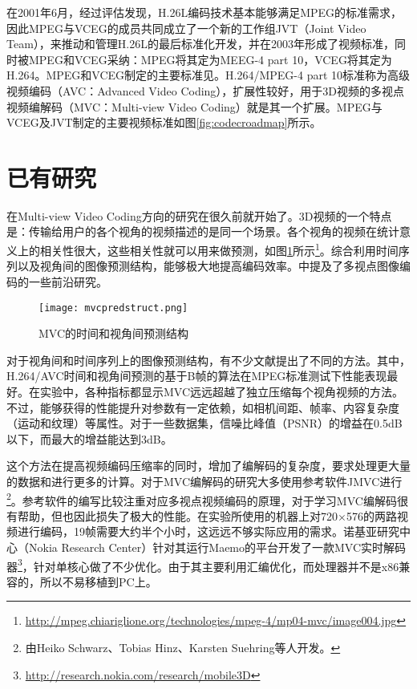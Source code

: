 在2001年6月，经过评估发现，H.26L编码技术基本能够满足MPEG的标准需求，因此MPEG与VCEG的成员共同成立了一个新的工作组JVT（Joint Video Team），来推动和管理H.26L的最后标准化开发，并在2003年形成了视频标准，同时被MPEG和VCEG采纳：MPEG将其定为MEEG-4 part 10，VCEG将其定为H.264。MPEG和VCEG制定的主要标准见。H.264/MPEG-4 part 10标准称为高级视频编码（AVC：Advanced Video Coding），扩展性较好，用于3D视频的多视点视频编解码（MVC：Multi-view Video Coding）就是其一个扩展。MPEG与VCEG及JVT制定的主要视频标准如图\ref{fig:codecroadmap}所示。

\section{已有研究}
\label{sec:previouswork}


在Multi-view Video Coding方向的研究在很久前就开始了。3D视频的一个特点是：传输给用户的各个视角的视频描述的是同一个场景。各个视角的视频在统计意义上的相关性很大，这些相关性就可以用来做预测，如图\ref{fig:mvcpredstruct}所示\footnote{\href{http://mpeg.chiariglione.org/technologies/mpeg-4/mp04-mvc/image004.jpg}{http://mpeg.chiariglione.org/technologies/mpeg-4/mp04-mvc/image004.jpg}}。综合利用时间序列以及视角间的图像预测结构，能够极大地提高编码效率\cite{merkle2005statistical,kaup2006analysis}。中提及了多视点图像编码的一些前沿研究。
\begin{figure}[htbp]
\begin{center}
\texttt{[image: mvcpredstruct.png]}
\caption{MVC的时间和视角间预测结构}
\label{fig:mvcpredstruct}
\end{center}
\end{figure}

对于视角间和时间序列上的图像预测结构，有不少文献提出了不同的方法。其中，H.264/AVC时间和视角间预测的基于B帧的算法\cite{kaup2006analysis}在MPEG标准测试下性能表现最好\cite{flierl2007motion,merkle2006efficient,mueller2006multi,merkle2007efficient}。在实验中，各种指标都显示MVC远远超越了独立压缩每个视角视频的方法。不过，能够获得的性能提升对参数有一定依赖，如相机间距、帧率、内容复杂度（运动和纹理）等属性。对于一些数据集，信噪比峰值（PSNR）的增益在0.5dB以下，而最大的增益能达到3dB。

这个方法在提高视频编码压缩率的同时，增加了编解码的复杂度，要求处理更大量的数据和进行更多的计算。对于MVC编解码的研究大多使用参考软件JMVC进行\footnote{由Heiko Schwarz、Tobias Hinz、Karsten Suehring等人开发。}。参考软件的编写比较注重对应多视点视频编码的原理，对于学习MVC编解码很有帮助，但也因此损失了极大的性能。在实验所使用的机器上对720$\times$576的两路视频进行编码，19帧需要大约半个小时，这远远不够实际应用的需求。诺基亚研究中心（Nokia Research Center）针对其运行Maemo的平台开发了一款MVC实时解码器\footnote{\href{http://research.nokia.com/research/mobile3D}{http://research.nokia.com/research/mobile3D}}，针对单核心做了不少优化。由于其主要利用汇编优化，而处理器并不是x86兼容的，所以不易移植到PC上。

